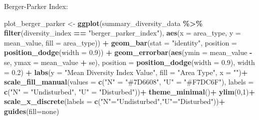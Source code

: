 \documentclass[
]{article}
\newenvironment{Shaded}{\begin{snugshade}}{\end{snugshade}}
\newcommand{\AttributeTok}[1]{\textcolor[rgb]{0.13,0.29,0.53}{#1}}
\newcommand{\DecValTok}[1]{\textcolor[rgb]{0.00,0.00,0.81}{#1}}
\newcommand{\FloatTok}[1]{\textcolor[rgb]{0.00,0.00,0.81}{#1}}
\newcommand{\FunctionTok}[1]{\textcolor[rgb]{0.13,0.29,0.53}{\textbf{#1}}}
\newcommand{\NormalTok}[1]{#1}
\newcommand{\OtherTok}[1]{\textcolor[rgb]{0.56,0.35,0.01}{#1}}
\newcommand{\SpecialCharTok}[1]{\textcolor[rgb]{0.81,0.36,0.00}{\textbf{#1}}}
\newcommand{\StringTok}[1]{\textcolor[rgb]{0.31,0.60,0.02}{#1}}
\begin{document}
Berger-Parker Index:

\begin{Shaded}
\begin{Highlighting}[]
\NormalTok{  plot\_berger\_parker }\OtherTok{\textless{}{-}} \FunctionTok{ggplot}\NormalTok{(summary\_diversity\_data }\SpecialCharTok{\%\textgreater{}\%} \FunctionTok{filter}\NormalTok{(diversity\_index }\SpecialCharTok{==} \StringTok{"berger\_parker\_index"}\NormalTok{), }
                               \FunctionTok{aes}\NormalTok{(}\AttributeTok{x =}\NormalTok{ area\_type, }\AttributeTok{y =}\NormalTok{ mean\_value, }\AttributeTok{fill =}\NormalTok{ area\_type)) }\SpecialCharTok{+}
    \FunctionTok{geom\_bar}\NormalTok{(}\AttributeTok{stat =} \StringTok{"identity"}\NormalTok{, }\AttributeTok{position =} \FunctionTok{position\_dodge}\NormalTok{(}\AttributeTok{width =} \FloatTok{0.9}\NormalTok{)) }\SpecialCharTok{+}
    \FunctionTok{geom\_errorbar}\NormalTok{(}\FunctionTok{aes}\NormalTok{(}\AttributeTok{ymin =}\NormalTok{ mean\_value }\SpecialCharTok{{-}}\NormalTok{ se, }\AttributeTok{ymax =}\NormalTok{ mean\_value }\SpecialCharTok{+}\NormalTok{ se), }
                  \AttributeTok{position =} \FunctionTok{position\_dodge}\NormalTok{(}\AttributeTok{width =} \FloatTok{0.9}\NormalTok{), }
                  \AttributeTok{width =} \FloatTok{0.2}\NormalTok{) }\SpecialCharTok{+}
    \FunctionTok{labs}\NormalTok{(}\AttributeTok{y =} \StringTok{"Mean Diversity Index Value"}\NormalTok{, }\AttributeTok{fill =} \StringTok{"Area Type"}\NormalTok{, }\AttributeTok{x =} \StringTok{""}\NormalTok{)}\SpecialCharTok{+}
    \FunctionTok{scale\_fill\_manual}\NormalTok{(}\AttributeTok{values =} \FunctionTok{c}\NormalTok{(}\StringTok{"N"} \OtherTok{=} \StringTok{"\#7D6608"}\NormalTok{, }\StringTok{"U"} \OtherTok{=} \StringTok{"\#F7DC6F"}\NormalTok{), }\AttributeTok{labels =} \FunctionTok{c}\NormalTok{(}\StringTok{"N"} \OtherTok{=} \StringTok{"Undisturbed"}\NormalTok{, }\StringTok{"U"} \OtherTok{=} \StringTok{"Disturbed"}\NormalTok{))}\SpecialCharTok{+}
    \FunctionTok{theme\_minimal}\NormalTok{()}\SpecialCharTok{+}
    \FunctionTok{ylim}\NormalTok{(}\DecValTok{0}\NormalTok{,}\DecValTok{1}\NormalTok{)}\SpecialCharTok{+}
    \FunctionTok{scale\_x\_discrete}\NormalTok{(}\AttributeTok{labels =} \FunctionTok{c}\NormalTok{(}\StringTok{"N"}\OtherTok{=}\StringTok{"Undisturbed"}\NormalTok{,}\StringTok{"U"}\OtherTok{=}\StringTok{"Disturbed"}\NormalTok{))}\SpecialCharTok{+}
    \FunctionTok{guides}\NormalTok{(}\AttributeTok{fill=}\StringTok{\textquotesingle{}none\textquotesingle{}}\NormalTok{)}
\end{Highlighting}
\end{Shaded}
\end{document}
